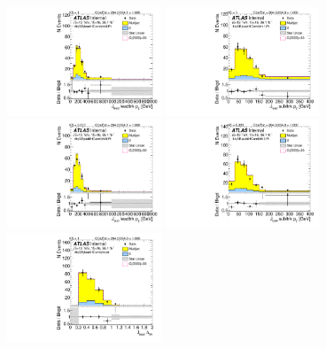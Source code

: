 \begin{figure}[htb!]
\begin{center}
\includegraphics[width=0.41\textwidth,angle=-90]{figures/boosted/Sideband/b77_FourTag_Sideband_leadHCand_trk0_Pt.pdf}
\includegraphics[width=0.41\textwidth,angle=-90]{figures/boosted/Sideband/b77_FourTag_Sideband_leadHCand_trk1_Pt.pdf}\\
\includegraphics[width=0.41\textwidth,angle=-90]{figures/boosted/Sideband/b77_FourTag_Sideband_sublHCand_trk0_Pt.pdf}
\includegraphics[width=0.41\textwidth,angle=-90]{figures/boosted/Sideband/b77_FourTag_Sideband_sublHCand_trk1_Pt.pdf}\\
\includegraphics[width=0.41\textwidth,angle=-90]{figures/boosted/Sideband/b77_FourTag_Sideband_leadHCand_trk_dr.pdf}

\end{center}
\end{figure}
